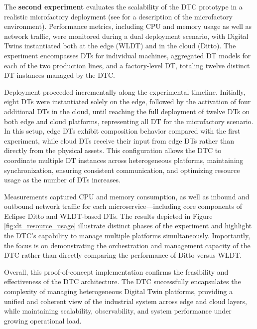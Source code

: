 The \textbf{second experiment} evaluates the scalability of the DTC prototype in a realistic microfactory deployment (see  for a description of the microfactory environment).
Performance metrics, including CPU and memory usage as well as network traffic, were monitored during a dual deployment scenario, with Digital Twins instantiated both at the edge (WLDT) and in the cloud (Ditto). The experiment encompasses DTs for individual machines, aggregated DT models for each of the two production lines, and a factory-level DT, totaling twelve distinct DT instances managed by the \ac{DTC}.

Deployment proceeded incrementally along the experimental timeline. Initially, eight DTs were instantiated solely on the edge, followed by the activation of four additional DTs in the cloud, until reaching the full deployment of twelve DTs on both edge and cloud platforms, representing all DT for the microfactory scenario.
%
In this setup, edge DTs exhibit composition behavior compared with the first experiment, while cloud DTs receive their input from edge DTs rather than directly from the physical assets. This configuration allows the DTC to coordinate multiple DT instances across heterogeneous platforms, maintaining synchronization, ensuring consistent communication, and optimizing resource usage as the number of DTs increases.

Measurements captured CPU and memory consumption, as well as inbound and outbound network traffic for each microservice—including core components of Eclipse Ditto and WLDT-based DTs. The results depicted in Figure \ref{fig:dt_resource_usage} illustrate distinct phases of the experiment and highlight the DTC's capability to manage multiple platforms simultaneously. Importantly, the focus is on demonstrating the orchestration and management capacity of the DTC rather than directly comparing the performance of Ditto versus WLDT.

Overall, this proof-of-concept implementation confirms the feasibility and effectiveness of the DTC architecture. The DTC successfully encapsulates the complexity of managing heterogeneous Digital Twin platforms, providing a unified and coherent view of the industrial system across edge and cloud layers, while maintaining scalability, observability, and system performance under growing operational load.


